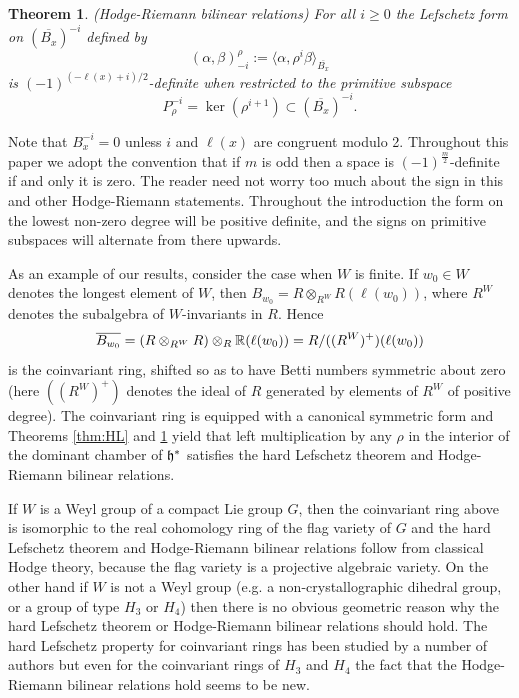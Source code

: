 \documentclass[11pt]{amsart}
\numberwithin{equation}{section}
\def\a{\alpha}
\def\b{\beta}
\def\ov{\overline}
\newtheorem{thm}{Theorem}[section]
\theoremstyle{definition}
\theoremstyle{remark}
\begin{document}
\begin{thm} (Hodge-Riemann bilinear relations) \label{thm:HR} For all
  $i \ge 0$ the Lefschetz form on $(\ov{B_x})^{-i}$ defined by \[ (\alpha, \beta)_{-i}^\rho := \langle \a, \rho^i \b \rangle_{\ov{B_x}} \]
is $(-1)^{(-\ell(x) + i)/2}$-definite when restricted to the primitive
subspace \[P_\rho^{-i} = \ker( \rho^{i+1}) \subset (\ov{B_x})^{-i}.\] \end{thm}

Note that $B_x^{-i} = 0$ unless $i$ and $\ell(x)$ are congruent modulo
2. Throughout this paper we adopt the convention that if $m$ is odd then a space is $(-1)^{\frac{m}{2}}$-definite
if and only it is zero. The reader need not worry too much about the sign in this and other Hodge-Riemann statements. Throughout the introduction the form on the
lowest non-zero degree will be positive definite, and the signs on
primitive subspaces will alternate from there upwards.

As an example of our results, consider the case when $W$ is
finite.  If $w_0 \in W$
denotes the longest element of $W$, then $B_{w_0} = R \otimes_{R^W} R(\ell(w_0))$, where $R^W$
denotes the subalgebra of $W$-invariants in $R$. Hence
\[
\overline{B_{w_0}} = (R \otimes_{R^W} R) \otimes_{R} {\mathbb{R}} (\ell(w_0)) = R/( (R^W)^+)(\ell(w_0))
\]
is the coinvariant ring, shifted so as to have Betti numbers
symmetric about zero (here $((R^W)^+)$ denotes the ideal of $R$
generated by elements of $R^W$ of positive degree). The coinvariant ring
is equipped with a canonical symmetric form and Theorems
\ref{thm:HL} and \ref{thm:HR} yield that left multiplication by any
$\rho$ in the interior of the dominant chamber of ${\mathfrak h}^*$ satisfies
the hard Lefschetz theorem and Hodge-Riemann bilinear relations.

If $W$ is a Weyl group of a compact Lie group $G$, then the coinvariant
ring above  is isomorphic to the real cohomology ring of the flag
variety of $G$ and the hard Lefschetz theorem and Hodge-Riemann
bilinear relations follow from classical Hodge theory, because the
flag variety is a projective algebraic variety. On the other hand if
$W$ is not a Weyl group (e.g. a non-crystallographic dihedral group,
or a group of type $H_3$ or $H_4$) then there is no obvious geometric
reason why the hard Lefschetz theorem or Hodge-Riemann bilinear
relations should hold. The hard Lefschetz property for coinvariant
rings has been studied by
a number of authors \cite{MNW, MW, McD} but even for the coinvariant rings of
$H_3$ and $H_4$ the fact that the Hodge-Riemann bilinear relations
hold seems to be new.
\end{document}
